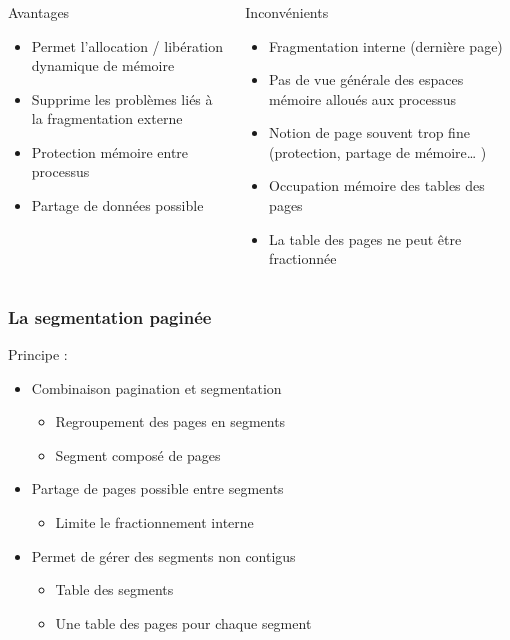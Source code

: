 \begin{frame}
\frametitle{}
\begin{columns}
\begin{block}{Avantages}
\begin{itemize}
\item Permet l'allocation / libération dynamique de mémoire
\item Supprime les problèmes liés à la fragmentation externe
\item Protection mémoire entre processus
\item Partage de données possible
\end{itemize}
\end{block}
\begin{block}{Inconvénients}
\begin{itemize}
\item Fragmentation interne (dernière page)
\item Pas de vue générale des espaces mémoire alloués aux processus
\item Notion de page souvent trop fine (protection, partage de mémoire… )
\item Occupation mémoire des tables des pages
\item La table des pages ne peut être fractionnée
\end{itemize}
\end{block}
\end{columns}
\end{frame}



\begin{frame}
\frametitle{La segmentation paginée}
Principe :
\begin{itemize}
\item Combinaison pagination et segmentation
\begin{itemize}
\item Regroupement des pages en segments
\item Segment composé de pages
\end{itemize}
\item Partage de pages possible entre segments
\begin{itemize}
\item Limite le fractionnement interne
\end{itemize}
\item Permet de gérer des segments non contigus
\begin{itemize}
\item Table des segments
\item Une table des pages pour chaque segment
\end{itemize}
\end{itemize}
\end{frame}



